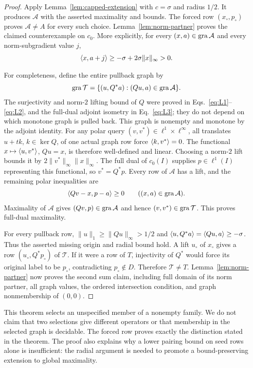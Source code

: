 \begin{proof}
Apply Lemma~\ref{lem:capped-extension} with $c=\sigma$ and radius
$1/2$. It produces $\mathcal A$ with the asserted maximality and
bounds. The forced row $(x_\circ,p_\circ)$ proves
$\mathcal A\ne A$ for every such choice. Lemma~\ref{lem:norm-partner}
proves the claimed counterexample on $c_0$. More explicitly, for every
$(x,a)\in\operatorname{gra}\mathcal A$ and every norm-subgradient value $j$,
\[
\langle x,a+j\rangle\ge-\sigma+2\sigma\|x\|_\infty>0.
\]

For completeness, define the entire pullback graph by
\[
\operatorname{gra}\mathcal T=\{(u,Q^*a):(Qu,a)\in\operatorname{gra}\mathcal A\}.
\]
The surjectivity and norm-$2$ lifting bound of $Q$ were proved in
Eqs.~\eqref{eq:L1}--\eqref{eq:L2}, and the full-dual adjoint isometry
in Eq.~\eqref{eq:L3}; they do not depend on which monotone graph is
pulled back. This graph is nonempty and monotone by the adjoint identity.
For any polar query $(v,v^*)\in\ell^1\times\ell^\infty$, all translates
$u+t k$, $k\in\ker Q$, of one actual graph row force
$\langle k,v^*\rangle=0$. The functional
$x\mapsto\langle u,v^*\rangle$, $Qu=x$, is therefore well-defined and linear.
Choosing a norm-$2$ lift bounds it by $2\|v^*\|_\infty\|x\|_\infty$.
The full dual of $c_0(I)$ supplies $p\in\ell^1(I)$ representing this
functional, so $v^*=Q^*p$. Every row of $\mathcal A$ has a lift, and
the remaining polar inequalities are
\[
\langle Qv-x,p-a\rangle\ge0\qquad((x,a)\in\operatorname{gra}\mathcal A).
\]
Maximality of $\mathcal A$ gives $(Qv,p)\in\operatorname{gra}\mathcal A$ and hence
$(v,v^*)\in\operatorname{gra}\mathcal T$. This proves full-dual maximality.

For every pullback row, $\|u\|_1\ge\|Qu\|_\infty>1/2$ and
$\langle u,Q^*a\rangle=\langle Qu,a\rangle\ge-\sigma$. Thus the asserted missing
origin and radial bound hold. A lift $u_\circ$ of $x_\circ$ gives a row
$(u_\circ,Q^*p_\circ)$ of $\mathcal T$. If it were a row of $T$,
injectivity of $Q^*$ would force its original label to be $p_\circ$,
contradicting $p_\circ\notin D$. Therefore $\mathcal T\ne T$.
Lemma~\ref{lem:norm-partner} now proves the second sum claim, including
full domain of its norm partner, all graph values, the ordered
intersection condition, and graph nonmembership of $(0,0)$.
\end{proof}

This theorem selects an unspecified member of a nonempty family. We do
not claim that two selections give different operators or that membership
in the selected graph is decidable. The forced row proves exactly the
distinction stated in the theorem. The proof also explains why a lower
pairing bound on seed rows alone is insufficient: the radial argument
is needed to promote a bound-preserving extension to global maximality.
